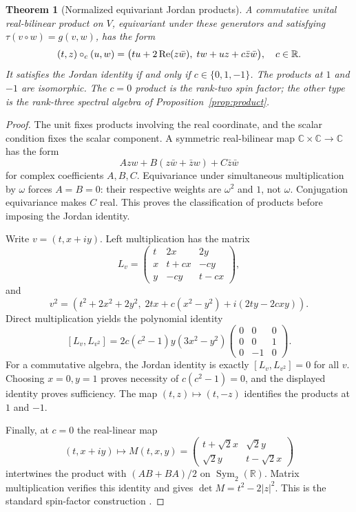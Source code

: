 \documentclass[11pt]{article}
\newtheorem{theorem}{Theorem}[section]
\theoremstyle{definition}\newtheorem{definition}[theorem]{Definition}
\newcommand{\R}{\mathbb R}\newcommand{\Q}{\mathbb Q}\newcommand{\Z}{\mathbb Z}
\newcommand{\C}{\mathbb C}\newcommand{\OO}{\mathbb O}
\begin{document}
\begin{theorem}[Normalized equivariant Jordan products]\label{thm:rigidity}
A commutative unital real-bilinear product on $V$, equivariant under these generators and satisfying $\tau(v\circ w)=g(v,w)$, has the form
\begin{equation}\label{eq:family}
 (t,z)\circ_c(u,w)=
 \bigl(tu+2\Rea(z\bar w),\;tw+uz+c\bar z\bar w\bigr),\quad c\in\R.
\end{equation}
It satisfies the Jordan identity if and only if $c\in\{0,1,-1\}$. The products at $1$ and $-1$ are isomorphic. The $c=0$ product is the rank-two spin factor; the other type is the rank-three spectral algebra of Proposition~\ref{prop:product}.
\end{theorem}
\begin{proof}
The unit fixes products involving the real coordinate, and the scalar condition fixes the scalar component. A symmetric real-bilinear map $\C\times\C\to\C$ has the form
\[
 A zw+B(z\bar w+\bar zw)+C\bar z\bar w
\]
for complex coefficients $A,B,C$. Equivariance under simultaneous multiplication by $\omega$ forces $A=B=0$: their respective weights are $\omega^2$ and $1$, not $\omega$. Conjugation equivariance makes $C$ real. This proves the classification of products before imposing the Jordan identity.

Write $v=(t,x+iy)$. Left multiplication has the matrix
\[
 L_v=\begin{pmatrix}
 t&2x&2y\\x&t+cx&-cy\\y&-cy&t-cx
 \end{pmatrix},
\]
and
\[
 v^2=(t^2+2x^2+2y^2,\;2tx+c(x^2-y^2)+i(2ty-2cxy)).
\]
Direct multiplication yields the polynomial identity
\begin{equation}\label{eq:commutator}
 [L_v,L_{v^2}]=2c(c^2-1)y(3x^2-y^2)
 \begin{pmatrix}0&0&0\\0&0&1\\0&-1&0\end{pmatrix}.
\end{equation}
For a commutative algebra, the Jordan identity is exactly $[L_v,L_{v^2}]=0$ for all $v$. Choosing $x=0,y=1$ proves necessity of $c(c^2-1)=0$, and the displayed identity proves sufficiency. The map $(t,z)\mapsto(t,-z)$ identifies the products at $1$ and $-1$.

Finally, at $c=0$ the real-linear map
\begin{equation}\label{eq:spin-matrix}
 (t,x+iy)\longmapsto
 M(t,x,y)=\begin{pmatrix}t+\sqrt2x&\sqrt2y\\\sqrt2y&t-\sqrt2x\end{pmatrix}
\end{equation}
intertwines the product with $(AB+BA)/2$ on $\operatorname{Sym}_2(\R)$. Matrix multiplication verifies this identity and gives $\det M=t^2-2|z|^2$. This is the standard spin-factor construction \cite[\S3.1]{baez}.
\end{proof}
\end{document}
